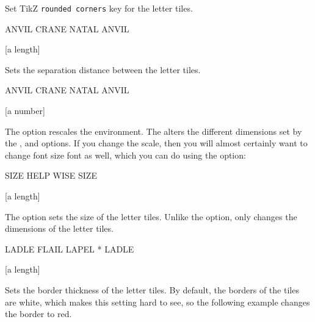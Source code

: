 \documentclass[svgnames]{report}
\begin{document}
  Set TikZ \texttt{rounded corners} key for the  letter tiles.

  \begin{example}
  \begin{wordle}[rounded=2mm]{ANVIL}
    CRANE
    NATAL
    ANVIL
  \end{wordle}
  \end{example}

  [a length]

  Sets the separation distance between the  letter
  tiles.

  \begin{example}
  \begin{wordle}[separation=2mm, borders=black]{ANVIL}
    CRANE
    NATAL
    ANVIL
  \end{wordle}
  \end{example}

  [a number]

  The  option rescales the  environment.
  The  alters the different dimensions set by the ,
    and   options.  If
  you change the scale, then you will almost certainly want
  to change font size font as well, which you can do using the
   option:

  \begin{example}
  \begin{wordle}[scale=1.5, font=\huge\bfseries]{SIZE}
     HELP
     WISE
     SIZE
  \end{wordle}
  \end{example}

  [a length]

  The  option sets the size of the  letter
  tiles. Unlike the  option,  only changes
  the dimensions of the letter tiles.

  \begin{example}
  \begin{wordle}[size=10mm, font=\huge\bfseries]{LADLE}
     FLAIL LAPEL * LADLE
  \end{wordle}
  \end{example}

  [a length]

  Sets the border thickness of the  letter tiles.  By
  default, the borders of the tiles are white, which makes this setting
  hard to see, so the following example changes the border to red.
\end{document}
